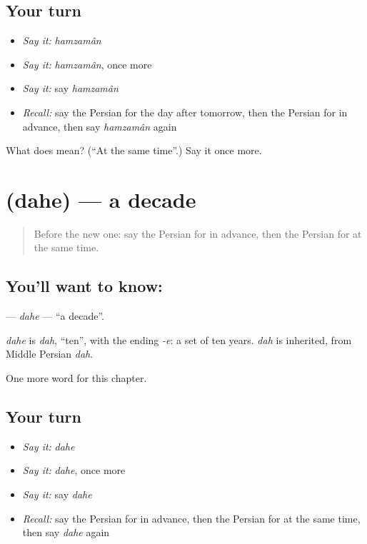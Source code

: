 \subsection*{Your turn}
\begin{itemize}
\raggedright
  \item \emph{Say it:} \emph{hamzamân}
  \item \emph{Say it:} \emph{hamzamân}, once more
  \item \emph{Say it:} say \emph{hamzamân}
  \item \emph{Recall:} say the Persian for the day after tomorrow, then the Persian for in advance, then say \emph{hamzamân} again
\end{itemize}

\begin{tcolorbox}[breakable,colback=teal!4,colframe=teal!35!black,title={Before you move on}]
What does  mean? (\textquotedblleft{}At the same time\textquotedblright{}.) Say it once more.
\end{tcolorbox}
\section[\texorpdfstring{\fa{دهه} (dahe)}{دهه (dahe)}]{ (dahe) — a decade}

\label{lesson:FA-C265-dahe}



\begin{quote}
Before the new one: say the Persian for in advance, then the Persian for at the same time.
\end{quote}

\subsection*{You'll want to know: }
\textbf{} — \emph{dahe} — \textquotedblleft{}a decade\textquotedblright{}.

\begin{cousinweb}
\emph{dahe} is \emph{dah}, \textquotedblleft{}ten\textquotedblright{}, with the ending \emph{-e}: a set of ten years. \emph{dah} is inherited, from Middle Persian \emph{dah}.
\end{cousinweb}

\begin{grammarlens}[title={What you've built}]
One more word for this chapter.
\end{grammarlens}

\subsection*{Your turn}
\begin{itemize}
\raggedright
  \item \emph{Say it:} \emph{dahe}
  \item \emph{Say it:} \emph{dahe}, once more
  \item \emph{Say it:} say \emph{dahe}
  \item \emph{Recall:} say the Persian for in advance, then the Persian for at the same time, then say \emph{dahe} again
\end{itemize}

